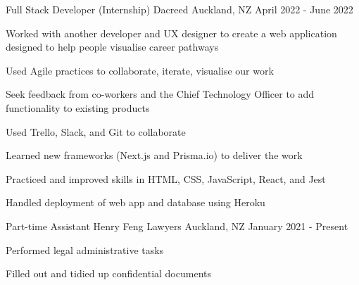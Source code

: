 

\begin{cventries}
  \cventry
    {Full Stack Developer (Internship)} %
    {Dacreed} %
    {Auckland, NZ} %
    {April 2022 - June 2022} %
    {
      \begin{cvitems} %
        \item {Worked with another developer and UX designer to create a web application designed to help people visualise career pathways}
        \item {Used Agile practices to collaborate, iterate, visualise our work}
        \item {Seek feedback from co-workers and the Chief Technology Officer to add functionality to existing products}
        \item {Used Trello, Slack, and Git to collaborate}
        \item {Learned new frameworks (Next.js and Prisma.io) to deliver the work}
        \item {Practiced and improved skills in HTML, CSS, JavaScript, React, and Jest}
        \item {Handled deployment of web app and database using Heroku}
      \end{cvitems}
    }

  \cventry
    {Part-time Assistant} %
    {Henry Feng Lawyers} %
    {Auckland, NZ} %
    {January 2021 - Present} %
    {
      \begin{cvitems} %
        \item {Performed legal administrative tasks}
        \item {Filled out and tidied up confidential documents}
      \end{cvitems}
    }


\end{cventries}
